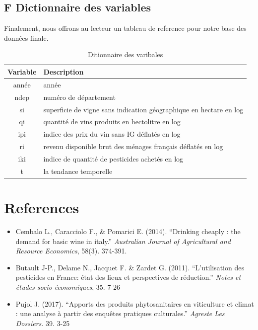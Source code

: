 \documentclass[11pt,]{article}
\providecommand{\tightlist}{%
  \setlength{\itemsep}{0pt}\setlength{\parskip}{0pt}}
\begin{document}
\hypertarget{f-dictionnaire-des-variables}{%
\subsection{F Dictionnaire des
variables}\label{f-dictionnaire-des-variables}}

Finalement, nous offrons au lecteur un tableau de reference pour notre
base des données finale.

\FloatBarrier

\begin{table}[!htbp]
  \centering
\caption{Ditionnaire des varibales}
\begin{tabular}{c|l}
  \hline
  Variable & Description \\
  \hline
année & année \\
ndep & numéro de département \\
si & superficie de vigne sans indication géographique en hectare en log \\
qi & quantité de vins produits en hectolitre en log \\
ipi & indice des prix du vin sans IG déflatés en log  \\
ri & revenu disponible brut des ménages français déflatés en log \\
iki & indice de quantité de pesticides achetés en log \\
t & la tendance temporelle \\
\hline
\end{tabular}
\end{table}

\FloatBarrier

\newpage

\hypertarget{references}{%
\section{References}\label{references}}

\begin{itemize}
\tightlist
\item
  Cembalo L., Caracciolo F., \& Pomarici E. (2014). ``Drinking cheaply :
  the demand for basic wine in italy.'' \emph{Australian Journal of
  Agricultural and Resource Economics}, 58(3). 374-391.
\item
  Butault J-P., Delame N., Jacquet F. \& Zardet G. (2011).
  ``L'utilisation des pesticides en France: état des lieux et
  perspectives de réduction.'' \emph{Notes et études socio-économiques},
  35. 7-26
\item
  Pujol J. (2017). ``Apports des produits phytosanitaires en viticulture
  et climat : une analyse à partir des enquêtes pratiques culturales.''
  \emph{Agreste Les Dossiers}. 39. 3-25
\end{itemize}
\end{document}
